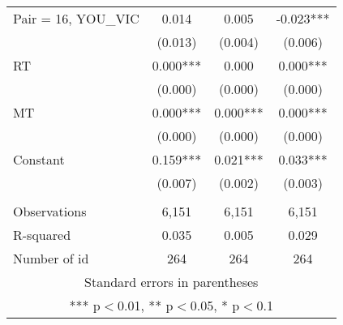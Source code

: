 \documentclass[]{article}
\begin{document}
\begin{tabular}{lccc}
Pair = 16, YOU\_VIC & 0.014 & 0.005 & -0.023*** \\
 & (0.013) & (0.004) & (0.006) \\
RT & 0.000*** & 0.000 & 0.000*** \\
 & (0.000) & (0.000) & (0.000) \\
MT & 0.000*** & 0.000*** & 0.000*** \\
 & (0.000) & (0.000) & (0.000) \\
Constant & 0.159*** & 0.021*** & 0.033*** \\
 & (0.007) & (0.002) & (0.003) \\
 &  &  &  \\
Observations & 6,151 & 6,151 & 6,151 \\
R-squared & 0.035 & 0.005 & 0.029 \\
 Number of id & 264 & 264 & 264 \\ \hline
\multicolumn{4}{c}{ Standard errors in parentheses} \\
\multicolumn{4}{c}{ *** p$<$0.01, ** p$<$0.05, * p$<$0.1} \\
\end{tabular}
\end{document}
